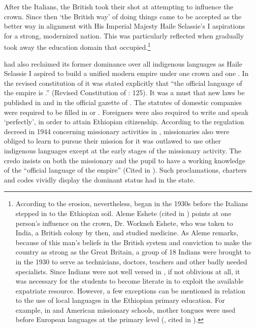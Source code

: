 \documentclass[output=paper,modfonts]{langscibook}
\begin{document}
After the Italians, the British took their shot at attempting to influence the crown. Since then ‘the British way’ of doing things came to be accepted as the better way in alignment with His Imperial Majesty Haile Selassie’s I aspirations for a strong, modernized nation. This was particularly reflected when gradually  took away the education domain that  occupied.\footnote{According to \citet{BowenHorn1976} the erosion, nevertheless, began in the 1930s before the Italians stepped in to the Ethiopian soil. Aleme Eshete (cited in \citealt{BowenHorn1976}) points at one person’s influence on the crown, Dr. Workneh Eshete, who was taken to India, a British colony by then, and studied medicine. As Aleme remarks, because of this man’s beliefs in the British system and conviction to make the country as strong as the Great Britain, a group of 18 Indians were brought to  in the 1930 to serve as technicians, doctors, teachers and other badly needed specialists. Since Indians were not well versed in , if not oblivious at all, it was necessary for the students to become literate in  to exploit the available expatriate resource. However, a few exceptions can be mentioned in relation to the use of local languages in the Ethiopian primary education. For example, in  and American missionary schools, mother tongues were used before European languages at the primary level (\citealt{McNab1988}, cited in \citealt[45]{HeughEtAl2007}).}

 had also reclaimed its former dominance over all indigenous languages as Haile Selassie I aspired to build a unified modern empire under one crown and one . In the revised constitution of  it was stated explicitly that “the official language of the empire is .” (Revised Constitution of : 125).
\nocite{revisedconstituionethiopia}
It was a must that new laws be published in  and  in the official gazette of . The statutes of domestic companies were required to be filled in  or . Foreigners were also required to write and speak  ‘perfectly’, in order to attain Ethiopian citizenship. According to the regulation decreed in 1944 concerning missionary activities in , missionaries also were obliged to learn  to pursue their mission for it was outlawed to use other indigenous languages except at the early stages of the missionary activity. The credo insists on both the missionary and the pupil to have a working knowledge of the “official language of the empire” (Cited in \citealt{Cooper1976}). Such proclamations, charters and codes vividly display the dominant status  had in the state.
\end{document}
